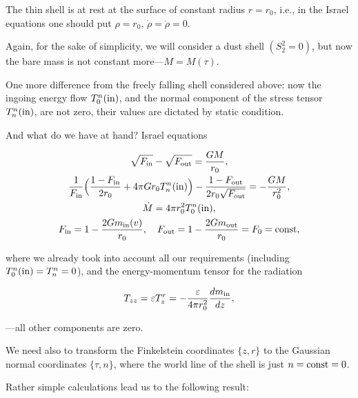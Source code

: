 The thin shell is at rest at the surface of constant radius $r = r_0$, i.e., in the Israel equations one should put $\rho = r_0$, $ \dot\rho = \ddot\rho = 0$. 

Again, for the sake of simplicity, we will consider a dust shell $(S^2_2 = 0)$, but now the bare mass is not constant more---$M = M(\tau)$. 

One more difference from the freely falling shell considered above: now the ingoing energy flow $T^n_0(\rm in)$, and the normal component of the stress tensor $T^n_n(\rm in)$, are not zero, their values are dictated by static condition.



And what do we have at hand? Israel equations

\begin{gather}

\sqrt{F_{\rm in}} - \sqrt{F_{\rm out}} = \frac{G M}{r_0} , \\

\frac{1}{F_{\rm in}} \Bigl( \frac{1 - F_{\rm in}}{2 r_0} + 4 \pi G r_0 T^n_n({\rm in})\Bigr) - \frac{1 - F_{\rm out}}{2 r_0 \sqrt{F_{\rm out}}} = - \frac{G M}{r_0^2}  , \\

\dot M = 4 \pi r_0^2 T^n_0({\rm in})  , \\

F_{\rm in} = 1 - \frac{2 G m_{\rm in}(v)}{r_0}  ,\quad  F_{\rm out} = 1 - \frac{2 G m_{\rm out}}{r_0} = F_0 = \rm const ,

\end{gather}

where we already took into account all our requirements (including $T^n_0({\rm in}) = T^n_n = 0$), and the energy-momentum tensor for the radiation

\begin{equation}

\label{setr}

T_{zz} = \varepsilon T^r_z = - \frac{\varepsilon}{4 \pi r_0^2} \frac{dm_{\rm in}}{dz} ,

\end{equation}

---all other components are zero. 

We need also to transform the Finkelstein coordi\-nates $\{z, r\}$ to the Gaussian normal coordinates $\{\tau, n \}$, where the world line of the shell is just $n = \rm const = 0$. 

Rather simple calculations lead us to the following result:

